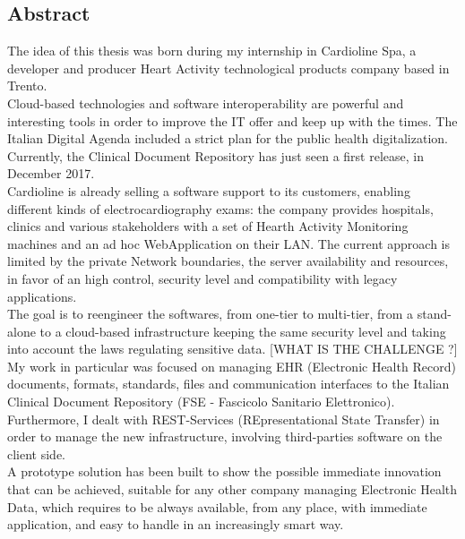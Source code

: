 \thispagestyle{empty}
\begin{center}
    {\chapter*{Abstract}} %
\end{center}
\label{abstract}

The idea of this thesis was born during my internship in Cardioline Spa, a developer and producer Heart Activity technological products company based in Trento.\\Cloud-based technologies and software interoperability are powerful and interesting tools in order to improve the IT offer and keep up with the times. The Italian Digital Agenda included a strict plan for the public health digitalization.\\Currently, the Clinical Document Repository has just seen a first release, in December 2017.\\Cardioline is already selling a software support to its customers, enabling different kinds of electrocardiography exams: the company provides hospitals, clinics and various stakeholders with a set of Hearth Activity Monitoring machines and an ad hoc WebApplication on their LAN. The current approach is limited by the private Network boundaries, the server availability and resources, in favor of an high control, security level and compatibility with legacy applications.\\The goal is to reengineer the softwares, from one-tier to multi-tier, from a stand-alone to a cloud-based infrastructure keeping the same security level and taking into account the laws regulating sensitive data. [WHAT IS THE CHALLENGE ?]\\My work in particular was focused on managing EHR (Electronic Health Record) documents, formats, standards, files and communication interfaces to the Italian Clinical Document Repository (FSE - Fascicolo Sanitario Elettronico).\\Furthermore, I dealt with REST-Services (REpresentational State Transfer) in order to manage the new infrastructure, involving third-parties software on the client side.\\A prototype solution has been built to show the possible immediate innovation that can be achieved, suitable for any other company managing Electronic Health Data, which requires to be always available, from any place, with immediate application, and easy to handle in an increasingly smart way.